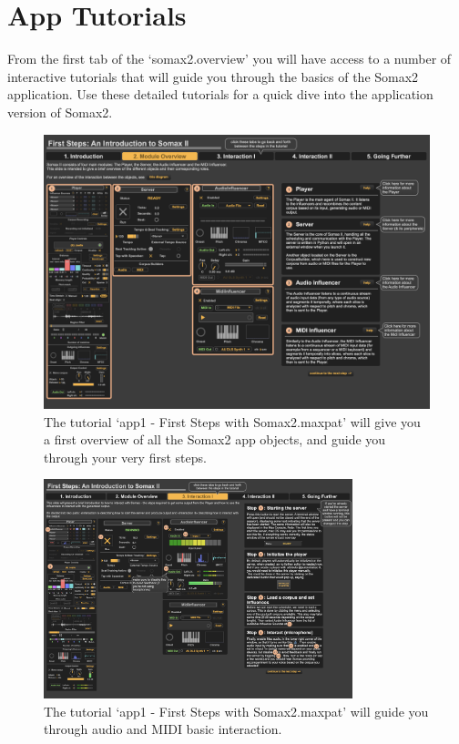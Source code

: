 \section{App Tutorials}

From the first tab of the `somax2.overview' you will have access to a number of interactive tutorials that will guide you through the basics of the Somax2 application. 
Use these detailed tutorials for a quick dive into the application version of Somax2.

\vspace{30mm}

 \begin{figure}[H]
    \centering        
 	\includegraphics[width=1\textwidth]{img/app1_overview.png}
    \caption{The tutorial `app1 - First Steps with Somax2.maxpat' will give you a first overview of all the Somax2 app objects, and guide you through your very first steps.}
    \label{fig:app1_overview}
\end{figure}


 \begin{figure}[H]
    \centering        
 	\includegraphics[width=0.8\textwidth]{img/app1_interaction.png}
    \caption{The tutorial `app1 - First Steps with Somax2.maxpat' will guide you through audio and MIDI basic interaction.}
    \label{fig:app1_interaction}
\end{figure}


